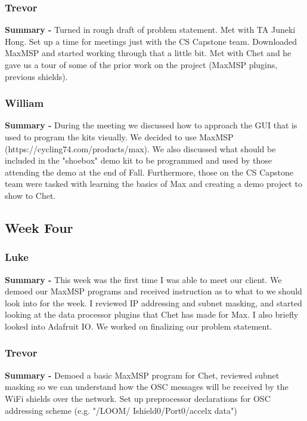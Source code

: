 \documentclass[onecolumn, draftclsnofoot,10pt, compsoc]{IEEEtran}
\begin{document}
\subsubsection*{Trevor}
    \begin{adjustwidth}{2.5em}{0pt}
    \textbf{Summary -} Turned in rough draft of problem statement. Met with TA Juneki Hong. Set up a time for meetings just with the CS Capstone team. Downloaded MaxMSP and started working through that a little bit. Met with Chet and he gave us a tour of some  of the prior work on the project (MaxMSP plugins, previous shields).
    \end{adjustwidth}
\subsubsection*{William}
    \begin{adjustwidth}{2.5em}{0pt}
    \textbf{Summary -} During the meeting we discussed how to approach the GUI that is used to program the kits visually. We decided to use MaxMSP (https://cycling74.com/products/max). We also discussed what should be included in the "shoebox" demo kit to be programmed and used by those attending the demo at the end of Fall. Furthermore, those on the CS Capstone team were tasked with learning the basics of Max and creating a demo project to show to Chet. 
    \end{adjustwidth}



\subsection{Week Four}
\subsubsection*{Luke}
    \begin{adjustwidth}{2.5em}{0pt}
    \textbf{Summary -} This week was the first time I was able to meet our client. We demoed our MaxMSP programs and received instruction as to what to we should look into for the week. I reviewed IP addressing and subnet masking, and started looking at the data processor plugins that Chet has made for Max. I also briefly looked into Adafruit IO. We worked on finalizing our problem statement.
    \end{adjustwidth} 
\subsubsection*{Trevor}
    \begin{adjustwidth}{2.5em}{0pt}
    \textbf{Summary -} Demoed a basic MaxMSP program for Chet, reviewed subnet masking so we can understand how the OSC messages will be received by the WiFi shields over the network. Set up preprocessor declarations for OSC addressing scheme (e.g. "/LOOM/    Ishield0/Port0/accelx data")
    \end{adjustwidth}
\end{document}
